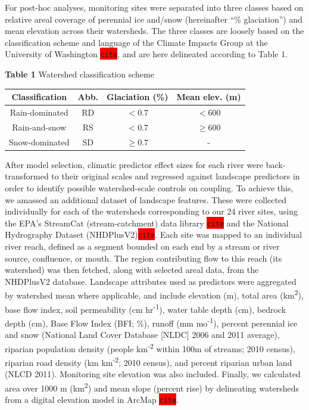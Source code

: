 \documentclass{article}
\begin{document}
For post-hoc analyses, monitoring sites were separated into three classes based on relative areal coverage of perennial ice and/snow (hereinafter ``\% glaciation'') and mean elevation across their watersheds. The three classes are loosely based on the classification scheme and language of the Climate Impacts Group at the University of Washington \colorbox{red}{\lstinline{cite}}, and are here delineated according to Table 1.

\begin{center}
\textbf{Table 1} Watershed classification scheme
\end{center}
\begin{center}
\begin{tabular}{ |c|c|c|c| }
 \hline
 Classification & Abb. & Glaciation (\%) & Mean elev. (m) \\
 \hline
 Rain-dominated & RD & $< 0.7$ & $< 600$ \\
 Rain-and-snow & RS & $< 0.7$ & $\geq 600$ \\
 Snow-dominated & SD & $\geq 0.7$ & - \\
 \hline
\end{tabular}
\end{center}

After model selection, climatic predictor effect sizes for each river were back-transformed to their original scales and regressed against landscape predictors in order to identify possible watershed-scale controls on coupling. To achieve this, we amassed an additional dataset of landscape features. These were collected individually for each of the watersheds corresponding to our 24 river sites, using the EPA's StreamCat (stream-catchment) data library \colorbox{red}{\lstinline{cite}} and the National Hydrography Dataset (NHDPlusV2)\colorbox{red}{\lstinline{cite}}. Each site was mapped to an individual river reach, defined as a segment bounded on each end by a stream or river source, confluence, or mouth. The region contributing flow to this reach (its watershed) was then fetched, along with selected areal data, from the NHDPlusV2 database. Landscape attributes used as predictors were aggregated by watershed mean where applicable, and include elevation (m), total area (km\textsuperscript{2}), base flow index, soil permeability (cm hr\textsuperscript{-1}), water table depth (cm), bedrock depth (cm), Base Flow Index (BFI; \%), runoff (mm mo\textsuperscript{-1}), percent perennial ice and snow (National Land Cover Database [NLDC] 2006 and 2011 average), riparian population density (people km\textsuperscript{-2} within 100m of streams; 2010 census), riparian road density (km km\textsuperscript{-2}; 2010 census), and percent riparian urban land (NLCD 2011). Monitoring site elevation was also included. Finally, we calculated area over 1000 m (km\textsuperscript{2}) and mean slope (percent rise) by delineating watersheds from a digital elevation model in ArcMap \colorbox{red}{\lstinline{cite}}.
\end{document}
